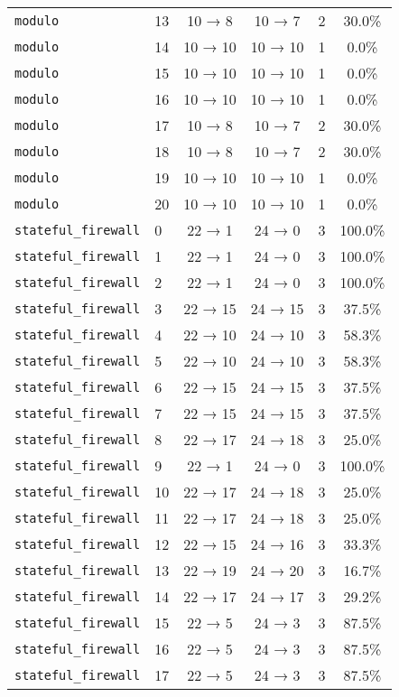\begin{tabular}{llcccc}
\texttt{modulo} & 13 & 10 → 8 & 10 → 7 & 2 & 30.0\% \\
\texttt{modulo} & 14 & 10 → 10 & 10 → 10 & 1 & 0.0\% \\
\texttt{modulo} & 15 & 10 → 10 & 10 → 10 & 1 & 0.0\% \\
\texttt{modulo} & 16 & 10 → 10 & 10 → 10 & 1 & 0.0\% \\
\texttt{modulo} & 17 & 10 → 8 & 10 → 7 & 2 & 30.0\% \\
\texttt{modulo} & 18 & 10 → 8 & 10 → 7 & 2 & 30.0\% \\
\texttt{modulo} & 19 & 10 → 10 & 10 → 10 & 1 & 0.0\% \\
\texttt{modulo} & 20 & 10 → 10 & 10 → 10 & 1 & 0.0\% \\
\texttt{stateful_firewall} & 0 & 22 → 1 & 24 → 0 & 3 & 100.0\% \\
\texttt{stateful_firewall} & 1 & 22 → 1 & 24 → 0 & 3 & 100.0\% \\
\texttt{stateful_firewall} & 2 & 22 → 1 & 24 → 0 & 3 & 100.0\% \\
\texttt{stateful_firewall} & 3 & 22 → 15 & 24 → 15 & 3 & 37.5\% \\
\texttt{stateful_firewall} & 4 & 22 → 10 & 24 → 10 & 3 & 58.3\% \\
\texttt{stateful_firewall} & 5 & 22 → 10 & 24 → 10 & 3 & 58.3\% \\
\texttt{stateful_firewall} & 6 & 22 → 15 & 24 → 15 & 3 & 37.5\% \\
\texttt{stateful_firewall} & 7 & 22 → 15 & 24 → 15 & 3 & 37.5\% \\
\texttt{stateful_firewall} & 8 & 22 → 17 & 24 → 18 & 3 & 25.0\% \\
\texttt{stateful_firewall} & 9 & 22 → 1 & 24 → 0 & 3 & 100.0\% \\
\texttt{stateful_firewall} & 10 & 22 → 17 & 24 → 18 & 3 & 25.0\% \\
\texttt{stateful_firewall} & 11 & 22 → 17 & 24 → 18 & 3 & 25.0\% \\
\texttt{stateful_firewall} & 12 & 22 → 15 & 24 → 16 & 3 & 33.3\% \\
\texttt{stateful_firewall} & 13 & 22 → 19 & 24 → 20 & 3 & 16.7\% \\
\texttt{stateful_firewall} & 14 & 22 → 17 & 24 → 17 & 3 & 29.2\% \\
\texttt{stateful_firewall} & 15 & 22 → 5 & 24 → 3 & 3 & 87.5\% \\
\texttt{stateful_firewall} & 16 & 22 → 5 & 24 → 3 & 3 & 87.5\% \\
\texttt{stateful_firewall} & 17 & 22 → 5 & 24 → 3 & 3 & 87.5\% \\

\end{tabular}

